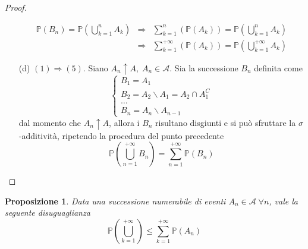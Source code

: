 \documentclass[a4paper,12pt]{article}
\theoremstyle{break}
\newtheorem{proposition}{Proposizione}[section]
\numberwithin{equation}{section}
\begin{document}
\begin{proof}
\begin{itemize}
\[\begin{array}{lll}
        \mathbb{P}(B_n) = \mathbb{P}\left(\bigcup_{k=1}^n A_k\right) & \Longrightarrow & \sum_{k=1}^n (\mathbb{P}(A_k)) = \mathbb{P}\left(\bigcup_{k=1}^n A_k\right) \\
        & \Longrightarrow & \sum_{k=1}^{+\infty} (\mathbb{P}(A_k)) = \mathbb{P}\left(\bigcup_{k=1}^{+\infty} A_k\right)
      \end{array}
    \]
    \item[(d)] \((1) \Longrightarrow (5)\). Siano \(A_n \uparrow A, \; A_n  \in \mathcal{A}\). Sia la successione \(B_n\) definita come
    \[
      \begin{cases}
        B_1 = A_1 \\
        B_2 = A_2 \backslash A_1 = A_2 \cap A_1^C \\
        \ldots \\
        B_n = A_n \backslash A_{n-1}
      \end{cases}
    \] 
    dal momento che \(A_n \uparrow A\), allora i \(B_n\) risultano disgiunti e si può sfruttare la \(\sigma\)-additività, ripetendo la procedura del punto precedente
    \[
      \mathbb{P}\left(\bigcup_{n = 1}^{+\infty} B_n\right) = \sum_{n=1}^{+\infty} \mathbb{P}(B_n)
    \]
  \end{itemize}
\end{proof}
\begin{proposition}
  Data una successione numerabile di eventi \(A_n \in \mathcal{A} \; \forall n\), vale la seguente disuguaglianza
  \[
    \mathbb{P}\left(\bigcup_{k=1}^{+\infty}\right) \leq \sum_{k=1}^{+\infty} \mathbb{P}(A_n)
  \]
\end{proposition}
\end{document}
